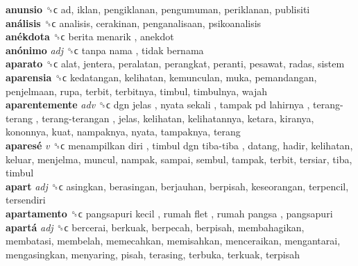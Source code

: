 \textbf{anunsio} ␝ϲ  ad, iklan, pengiklanan, pengumuman, periklanan, publisiti  \\
\textbf{análisis} ␝ϲ  analisis, cerakinan, penganalisaan, psikoanalisis  \\
\textbf{anékdota} ␝ϲ   berita menarik , anekdot  \\
\textbf{anónimo} \emph{adj}  ␝ϲ   tanpa nama ,  tidak bernama   \\
\textbf{aparato} ␝ϲ  alat, jentera, peralatan, perangkat, peranti, pesawat, radas, sistem  \\
\textbf{aparensia} ␝ϲ  kedatangan, kelihatan, kemunculan, muka, pemandangan, penjelmaan, rupa, terbit, terbitnya, timbul, timbulnya, wajah  \\
\textbf{aparentemente} \emph{adv}  ␝ϲ   dgn jelas ,  nyata sekali ,  tampak pd lahirnya ,  terang-terang ,  terang-terangan , jelas, kelihatan, kelihatannya, ketara, kiranya, kononnya, kuat, nampaknya, nyata, tampaknya, terang  \\
\textbf{aparesé} \emph{v}  ␝ϲ   menampilkan diri ,  timbul dgn tiba-tiba , datang, hadir, kelihatan, keluar, menjelma, muncul, nampak, sampai, sembul, tampak, terbit, tersiar, tiba, timbul  \\
\textbf{apart} \emph{adj}  ␝ϲ  asingkan, berasingan, berjauhan, berpisah, keseorangan, terpencil, tersendiri  \\
\textbf{apartamento} ␝ϲ   pangsapuri kecil ,  rumah flet ,  rumah pangsa , pangsapuri  \\
\textbf{apartá} \emph{adj}  ␝ϲ  bercerai, berkuak, berpecah, berpisah, membahagikan, membatasi, membelah, memecahkan, memisahkan, menceraikan, mengantarai, mengasingkan, menyaring, pisah, terasing, terbuka, terkuak, terpisah  \\
